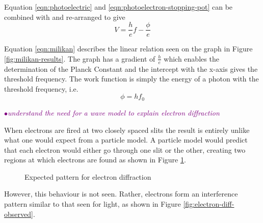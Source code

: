 \documentclass[a4paper,11pt,twoside]{memoir}
\newcounter{spec}[chapter]
\newcommand{\spec}[1]{\Needspace{5\baselineskip}\textcolor{purple}{$\bullet$\hspace{0.5cm}\textit{#1}}}
\begin{document}
Equation \ref{eqn:photoelectric} and \ref{eqn:photoelectron-stopping-pot} can be combined with  and re-arranged to give
\begin{equation}\label{eqn:milikan}
V = \frac{h}{e}f - \frac{\phi}{e}
\end{equation}

Equation \ref{eqn:milikan} describes the linear relation seen on the graph in Figure \ref{fig:milikan-results}. The graph has a gradient of $\frac{h}{e}$ which enables the determination of the Planck Constant and the intercept with the x-axis gives the threshold frequency. The work function is simply the energy of a photon with the threshold frequency, i.e.
\begin{equation}
  \phi = hf_0
\end{equation}

\spec{understand the need for a wave model to explain electron diffraction}

When electrons are fired at two closely spaced slits the result is entirely unlike what one would expect from a particle model. A particle model would predict that each electron would either go through one slit or the other, creating two regions at which electrons are found as shown in Figure \ref{fig:electron-diff-expected}.

\begin{figure}[h]
  \begin{center}
  \end{center}
  \caption{Expected pattern for electron diffraction}
  \label{fig:electron-diff-expected}
\end{figure}


However, this behaviour is not seen. Rather, electrons form an interference pattern similar to that seen for light, as shown in Figure \ref{fig:electron-diff-observed}.
\end{document}
